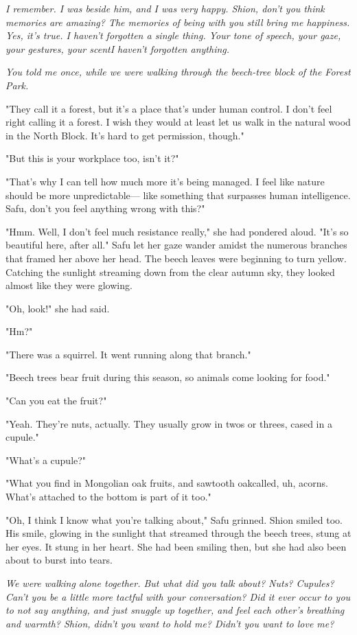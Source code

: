 \emph{I remember. I was beside him, and I was very happy. Shion, don't you
think memories are amazing? The memories of being with you still bring
me happiness. Yes, it's true. I haven't forgotten a single thing. Your
tone of speech, your gaze, your gestures, your scent\el I haven't
forgotten anything.}

\emph{You told me once, while we were walking through the beech-tree block of
the Forest Park.}

"They call it a forest, but it's a place that's under human control. I
don't feel right calling it a forest. I wish they would at least let us
walk in the natural wood in the North Block. It's hard to get
permission, though."

"But this is your workplace too, isn't it?"

"That's why I can tell how much more it's being managed. I feel like
nature should be more unpredictable--- like something that surpasses human
intelligence. Safu, don't you feel anything wrong with this?"

"Hmm. Well, I don't feel much resistance really," she had pondered
aloud. "It's so beautiful here, after all." Safu let her gaze wander
amidst the numerous branches that framed her above her head. The beech
leaves were beginning to turn yellow. Catching the sunlight streaming
down from the clear autumn sky, they looked almost like they were
glowing.

"Oh, look!" she had said.

"Hm?"

"There was a squirrel. It went running along that branch."

"Beech trees bear fruit during this season, so animals come looking for
food."

"Can you eat the fruit?"

"Yeah. They're nuts, actually. They usually grow in twos or threes,
cased in a cupule."

"What's a cupule?"

"What you find in Mongolian oak fruits, and sawtooth oak\el called, uh,
acorns. What's attached to the bottom is part of it too."

"Oh, I think I know what you're talking about," Safu grinned. Shion
smiled too. His smile, glowing in the sunlight that streamed through the
beech trees, stung at her eyes. It stung in her heart. She had been
smiling then, but she had also been about to burst into tears.

\emph{We were walking alone together. But what did you talk about? Nuts?
Cupules? Can't you be a little more tactful with your conversation? Did
it ever occur to you to not say anything, and just snuggle up together,
and feel each other's breathing and warmth? Shion, didn't you want to
hold me? Didn't you want to love me?}

